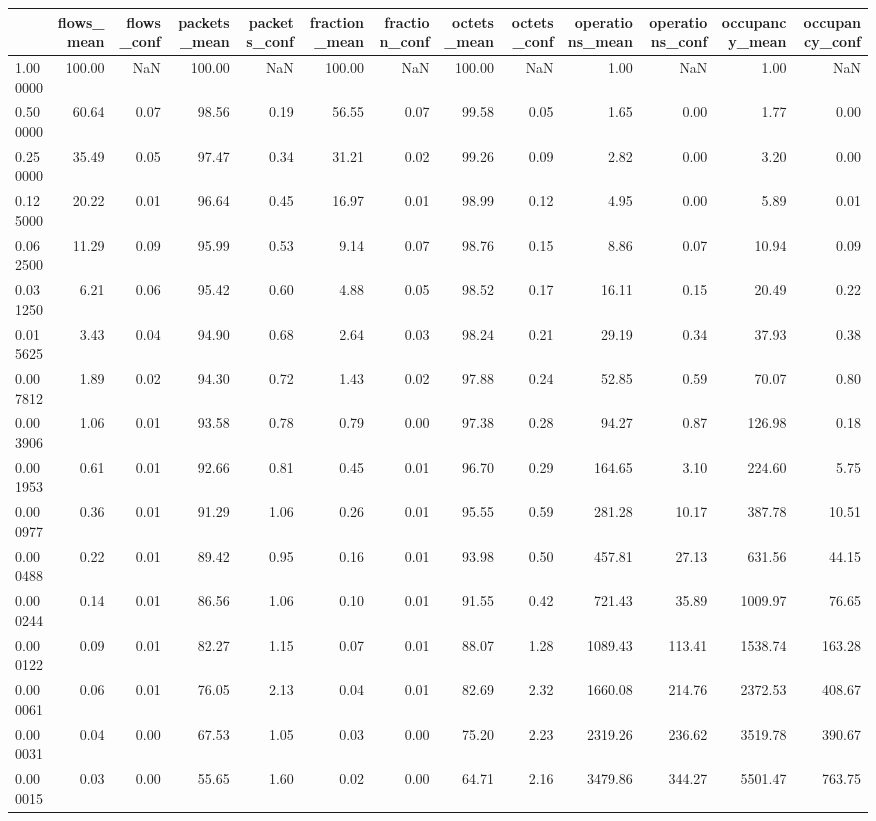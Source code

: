 \begin{tabular}{lrrrrrrrrrrrr}
\toprule
 & flows_mean & flows_conf & packets_mean & packets_conf & fraction_mean & fraction_conf & octets_mean & octets_conf & operations_mean & operations_conf & occupancy_mean & occupancy_conf \\
\midrule
1.000000 & 100.00 & NaN & 100.00 & NaN & 100.00 & NaN & 100.00 & NaN & 1.00 & NaN & 1.00 & NaN \\
0.500000 & 60.64 & 0.07 & 98.56 & 0.19 & 56.55 & 0.07 & 99.58 & 0.05 & 1.65 & 0.00 & 1.77 & 0.00 \\
0.250000 & 35.49 & 0.05 & 97.47 & 0.34 & 31.21 & 0.02 & 99.26 & 0.09 & 2.82 & 0.00 & 3.20 & 0.00 \\
0.125000 & 20.22 & 0.01 & 96.64 & 0.45 & 16.97 & 0.01 & 98.99 & 0.12 & 4.95 & 0.00 & 5.89 & 0.01 \\
0.062500 & 11.29 & 0.09 & 95.99 & 0.53 & 9.14 & 0.07 & 98.76 & 0.15 & 8.86 & 0.07 & 10.94 & 0.09 \\
0.031250 & 6.21 & 0.06 & 95.42 & 0.60 & 4.88 & 0.05 & 98.52 & 0.17 & 16.11 & 0.15 & 20.49 & 0.22 \\
0.015625 & 3.43 & 0.04 & 94.90 & 0.68 & 2.64 & 0.03 & 98.24 & 0.21 & 29.19 & 0.34 & 37.93 & 0.38 \\
0.007812 & 1.89 & 0.02 & 94.30 & 0.72 & 1.43 & 0.02 & 97.88 & 0.24 & 52.85 & 0.59 & 70.07 & 0.80 \\
0.003906 & 1.06 & 0.01 & 93.58 & 0.78 & 0.79 & 0.00 & 97.38 & 0.28 & 94.27 & 0.87 & 126.98 & 0.18 \\
0.001953 & 0.61 & 0.01 & 92.66 & 0.81 & 0.45 & 0.01 & 96.70 & 0.29 & 164.65 & 3.10 & 224.60 & 5.75 \\
0.000977 & 0.36 & 0.01 & 91.29 & 1.06 & 0.26 & 0.01 & 95.55 & 0.59 & 281.28 & 10.17 & 387.78 & 10.51 \\
0.000488 & 0.22 & 0.01 & 89.42 & 0.95 & 0.16 & 0.01 & 93.98 & 0.50 & 457.81 & 27.13 & 631.56 & 44.15 \\
0.000244 & 0.14 & 0.01 & 86.56 & 1.06 & 0.10 & 0.01 & 91.55 & 0.42 & 721.43 & 35.89 & 1009.97 & 76.65 \\
0.000122 & 0.09 & 0.01 & 82.27 & 1.15 & 0.07 & 0.01 & 88.07 & 1.28 & 1089.43 & 113.41 & 1538.74 & 163.28 \\
0.000061 & 0.06 & 0.01 & 76.05 & 2.13 & 0.04 & 0.01 & 82.69 & 2.32 & 1660.08 & 214.76 & 2372.53 & 408.67 \\
0.000031 & 0.04 & 0.00 & 67.53 & 1.05 & 0.03 & 0.00 & 75.20 & 2.23 & 2319.26 & 236.62 & 3519.78 & 390.67 \\
0.000015 & 0.03 & 0.00 & 55.65 & 1.60 & 0.02 & 0.00 & 64.71 & 2.16 & 3479.86 & 344.27 & 5501.47 & 763.75 \\

\end{tabular}
